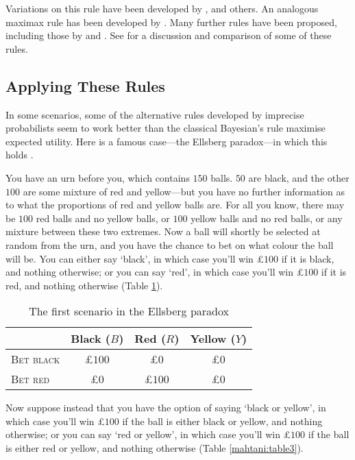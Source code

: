 Variations on this rule have been developed by \citet{gardenforssahlin1982,gilboaschmeidler1989}, and others. An analogous maximax rule has been developed by \citet{satialave1973}. Many further rules have been proposed, including those by \citet{arrowhurwicz1972} and \citet{ellsberg1961}. See \citet{troffaes2007} for a discussion and comparison of some of these rules. 


\subsection{Applying These Rules}

In some scenarios, some of the alternative rules developed by imprecise probabilists seem to work better than the classical Bayesian's rule maximise expected utility. Here is a famous case---the Ellsberg paradox---in which this holds \citep{ellsberg1961}.
 
You have an urn before you, which contains $150$ balls. $50$ are black, and the other $100$ are some mixture of red and yellow---but you have no further information as to what the proportions of red and yellow balls are. For all you know, there may be $100$ red balls and no yellow balls, or $100$ yellow balls and no red balls, or any mixture between these two extremes. Now a ball will shortly be selected at random from the urn, and you have the chance to bet on what colour the ball will be. You can either say `black', in which case you'll win £$100$ if it is black, and nothing otherwise; or you can say `red', in which case you'll win £$100$ if it is red, and nothing otherwise (Table \ref{mahtani:table2}). 

\begin{table}[ht]
\centering
  \begin{tabular}{lccc}
    \hline
                       & Black ($B$) & Red ($R$) & Yellow ($Y$) \\\hline\hline
    \textsc{Bet black} & £$100$ & £$0$ & £$0$\\
    \textsc{Bet red}   & £$0$ & £$100$ & £$0$\\ 
    \hline
  \end{tabular}
\caption{The first scenario in the Ellsberg paradox}
\label{mahtani:table2}
\end{table}

Now suppose instead that you have the option of saying `black or yellow', in which case you'll win £$100$ if the ball is either black or yellow, and nothing otherwise; or you can say `red or yellow', in which case you'll win £$100$ if the ball is either red or yellow, and nothing otherwise (Table \ref{mahtani:table3}).

